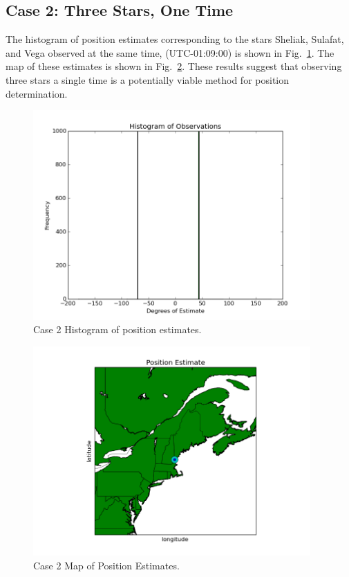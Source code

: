 \documentclass[12pt,a4paper]{book}
\begin{document}
\subsection*{Case 2: Three Stars, One Time}
The histogram of position estimates corresponding to the stars Sheliak, Sulafat, and Vega observed at the same time, (UTC-01:09:00) is shown in Fig.~\ref{f:3s1t_z_z}.  The map of these estimates is shown in Fig.~\ref{f:3s1t_z_z_map}. These results suggest that observing three stars a single time is a potentially viable method for position determination. 
\begin{figure}[!h]%
\centering
\includegraphics[height=8cm]{3s1t_z_z.png}
\caption{Case 2 Histogram of position estimates.}
\label{f:3s1t_z_z}
\end{figure}
\begin{figure}[!h]%
\centering
\includegraphics[height=8cm]{3s1t_z_z_map.png}
\caption{Case 2 Map of Position Estimates.}
\label{f:3s1t_z_z_map}
\end{figure}
\FloatBarrier
\end{document}
